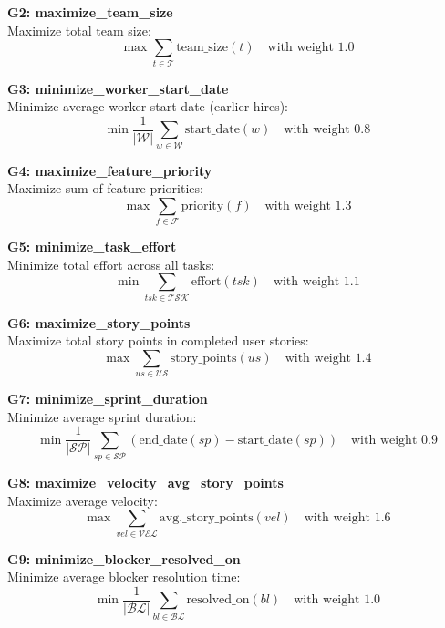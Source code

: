 \documentclass[12pt]{article}
\begin{document}
    \item \textbf{G2: maximize\_team\_size} \\
    Maximize total team size:
    \[
    \max \sum_{t \in \mathcal{T}} \text{team\_size}(t) \quad \text{with weight } 1.0
    \]

    \item \textbf{G3: minimize\_worker\_start\_date} \\
    Minimize average worker start date (earlier hires):
    \[
    \min \frac{1}{|\mathcal{W}|} \sum_{w \in \mathcal{W}} \text{start\_date}(w) \quad \text{with weight } 0.8
    \]

    \item \textbf{G4: maximize\_feature\_priority} \\
    Maximize sum of feature priorities:
    \[
    \max \sum_{f \in \mathcal{F}} \text{priority}(f) \quad \text{with weight } 1.3
    \]

    \item \textbf{G5: minimize\_task\_effort} \\
    Minimize total effort across all tasks:
    \[
    \min \sum_{tsk \in \mathcal{TSK}} \text{effort}(tsk) \quad \text{with weight } 1.1
    \]

    \item \textbf{G6: maximize\_story\_points} \\
    Maximize total story points in completed user stories:
    \[
    \max \sum_{us \in \mathcal{US}} \text{story\_points}(us) \quad \text{with weight } 1.4
    \]

    \item \textbf{G7: minimize\_sprint\_duration} \\
    Minimize average sprint duration:
    \[
    \min \frac{1}{|\mathcal{SP}|} \sum_{sp \in \mathcal{SP}} (\text{end\_date}(sp) - \text{start\_date}(sp)) \quad \text{with weight } 0.9
    \]

    \item \textbf{G8: maximize\_velocity\_avg\_story\_points} \\
    Maximize average velocity:
    \[
    \max \sum_{vel \in \mathcal{VEL}} \text{avg.\_story\_points}(vel) \quad \text{with weight } 1.6
    \]

    \item \textbf{G9: minimize\_blocker\_resolved\_on} \\
    Minimize average blocker resolution time:
    \[
    \min \frac{1}{|\mathcal{BL}|} \sum_{bl \in \mathcal{BL}} \text{resolved\_on}(bl) \quad \text{with weight } 1.0
    \]
\end{document}
